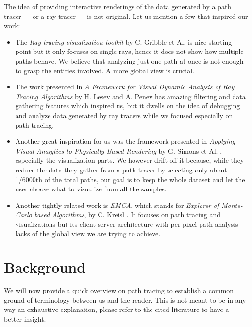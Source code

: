The idea of providing interactive renderings of the data generated by a path tracer --- or a ray tracer --- is not original. Let us mention a few that inspired our work:
\begin{itemize}
	\item The \textit{Ray tracing visualization toolkit} by C. Gribble et Al. \cite{gribble2012ray} is nice starting point but it only focuses on single rays, hence it does not show how multiple paths behave. We believe that analyzing just one path at once is not enough to grasp the entities involved. A more global view is crucial.
	\item The work presented in \textit{A Framework for Visual Dynamic Analysis of Ray Tracing Algorithms} by H. Lesev and A. Penev \cite{lesev2014framework} has amazing filtering and data gathering features which inspired us, but it dwells on the idea of debugging and analyze data generated by ray tracers \cite{whitted1979improved}\cite{cook1984distributed} while we focused especially on path tracing.
	\item Another great inspiration for us was the framework presented in \textit{Applying Visual Analytics to Physically Based Rendering} by G. Simons et Al. \cite{simons2019applying}, especially the visualization parts. We however drift off it because, while they reduce the data they gather from a path tracer by selecting only about 1/6000th of the total paths, our goal is to keep the whole dataset and let the user choose what to visualize from all the samples.
	\item Another tightly related work is \textit{EMCA}, which stands for \textit{Explorer of Monte-Carlo based Algorithms}, by C. Kreisl \cite{EMCA@2019}. It focuses on path tracing and visualizations but its client-server architecture with per-pixel path analysis lacks of the global view we are trying to achieve.
\end{itemize}  

\section{Background}
\label{background}


We will now provide a quick overview on path tracing to establish a common ground of terminology between us and the reader. This is not meant to be in any way an exhaustive explanation, please refer to the cited literature to have a better insight.

